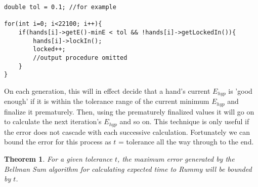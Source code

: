 \documentclass[paper=a4, fontsize=11pt,twoside]{report}   %
\newtheorem{theorem}{Theorem}
\begin{document}
\singlespacing
\begin{verbatim}
double tol = 0.1; //for example

for(int i=0; i<22100; i++){
    if(hands[i]->getE()-minE < tol && !hands[i]->getLockedIn()){
        hands[i]->lockIn();
        locked++;
        //output procedure omitted
    }
}
\end{verbatim}
\doublespacing

On each generation, this will in effect decide that a hand's current $E_{hyp}$ is 'good enough' if it is within the tolerance range of the current minimum $E_{hyp}$ and finalize it prematurely. Then, using the prematurely finalized values it will go on to calculate the next iteration's $E_{hyp}$ and so on. This technique is only useful if the error does not cascade with each successive calculation. Fortunately we can bound the error for this process as $t$ = tolerance all the way through to the end.

\begin{theorem}
For a given tolerance $t$, the maximum error generated by the Bellman Sum algorithm for calculating expected time to Rummy will be bounded by $t$.
\end{theorem}
\end{document}
